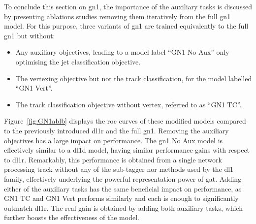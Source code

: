 To conclude this section on \gls{gn1}, the importance of the auxiliary tasks is discussed by presenting ablations studies removing them iteratively from the full \gls{gn1} model. For this purpose, three variants of \gls{gn1} are trained equivalently to the full \gls{gn1} but without:
\begin{itemize}
  \item Any auxiliary objectives, leading to a model label ``GN1 No Aux'' only optimising the jet classification objective.
  \item The vertexing objective but not the track classification, for the model labelled ``GN1 Vert''.
  \item The track classification objective without vertex, referred to as ``GN1 TC''.
\end{itemize}
Figure~\ref{fig:GN1ablb} displays the \gls{roc} curves of these modified models compared to the previously introduced \gls{dl1r} and the full \gls{gn1}. Removing the auxiliary objectives has a large impact on performance. The \gls{gn1} No Aux model is effectively similar to a \gls{dl1d} model, having similar performance gains with respect to \gls{dl1r}. Remarkably, this performance is obtained from a single network processing track without any of the sub-tagger nor methods used by the \gls{dl1} family, effectively underlying the powerful representation power of \gls{gat}. Adding either of the auxiliary tasks has the same beneficial impact on performance, as GN1 TC and GN1 Vert performs similarly and each is enough to significantly outmatch \gls{dl1r}. The real gain is obtained by adding both auxiliary tasks, which further boosts the effectiveness of the model.

